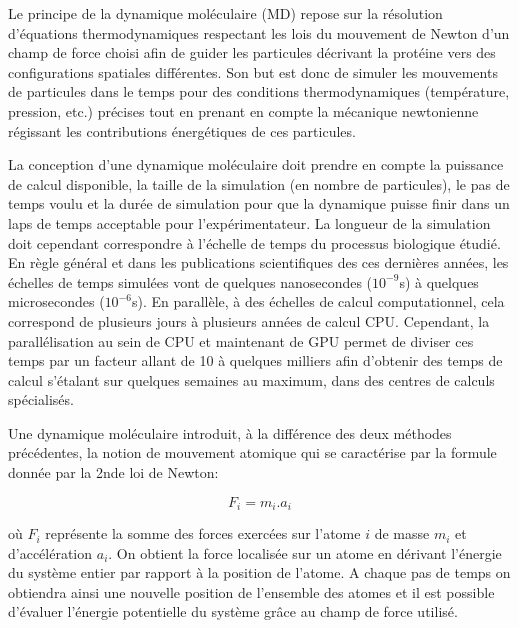 
Le principe de la dynamique moléculaire (MD) repose sur la résolution d'équations thermodynamiques respectant les lois du mouvement de Newton d'un champ de force choisi afin de guider les particules décrivant la protéine vers des configurations spatiales différentes. Son but est donc de simuler les mouvements de particules dans le temps pour des conditions thermodynamiques (température, pression, etc.) précises tout en prenant en compte la mécanique newtonienne régissant les contributions énergétiques de ces particules.

La conception d'une dynamique moléculaire doit prendre en compte la puissance de calcul disponible, la taille de la simulation (en nombre de particules), le pas de temps voulu et la durée de simulation pour que la dynamique puisse finir dans un laps de temps acceptable pour l'expérimentateur. La longueur de la simulation doit cependant correspondre à l'échelle de temps du processus biologique étudié. En règle général et dans les publications scientifiques des ces dernières années, les échelles de temps simulées vont de quelques nanosecondes ($10^{-9}$s) à quelques microsecondes ($10^{-6}$s). En parallèle, à des échelles de calcul computationnel, cela correspond de plusieurs jours à plusieurs années de calcul CPU. Cependant, la parallélisation au sein de CPU et maintenant de GPU permet de diviser ces temps par un facteur allant de 10 à quelques milliers afin d'obtenir des temps de calcul s'étalant sur quelques semaines au maximum, dans des centres de calculs spécialisés.

Une dynamique moléculaire introduit, à la différence des deux méthodes précédentes, la notion de mouvement atomique qui se caractérise par la formule donnée par la 2nde loi de Newton:

$$F_i = m_i.a_i$$

où $F_i$ représente la somme des forces exercées sur l'atome $i$ de masse $m_i$ et d'accélération $a_i$. On obtient la force localisée sur un atome en dérivant l'énergie du système entier par rapport à la position de l'atome. A chaque pas de temps on obtiendra ainsi une nouvelle position de l'ensemble des atomes et il est possible d'évaluer l'énergie potentielle du système grâce au champ de force utilisé.

